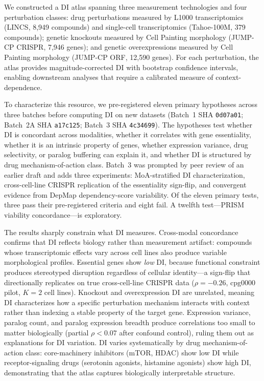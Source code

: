 \documentclass[11pt]{article}
\begin{document}
We constructed a DI atlas spanning three measurement technologies and
four perturbation classes: drug perturbations measured by L1000
transcriptomics (LINCS, 8{,}949 compounds) and single-cell
transcriptomics (Tahoe-100M, 379 compounds); genetic knockouts measured
by Cell Painting morphology (JUMP-CP CRISPR, 7{,}946 genes); and
genetic overexpressions measured by Cell Painting morphology (JUMP-CP
ORF, 12{,}590 genes).  For each perturbation, the atlas provides
magnitude-corrected DI with bootstrap confidence intervals, enabling
downstream analyses that require a calibrated measure of
context-dependence.

To characterize this resource, we pre-registered eleven primary
hypotheses across three batches before computing DI on new datasets
(Batch~1 SHA \texttt{0d07a01}; Batch~2A SHA \texttt{a17c125};
Batch~3 SHA \texttt{4c34699}).  The
hypotheses test whether DI is concordant across modalities,
whether it correlates with gene essentiality, whether it is an
intrinsic property of genes, whether expression variance,
drug selectivity, or paralog buffering can explain it, and whether
DI is structured by drug mechanism-of-action class.
Batch~3 was prompted by peer review of an earlier draft and adds three
experiments: MoA-stratified DI characterization, cross-cell-line CRISPR
replication of the essentiality sign-flip, and convergent evidence from
DepMap dependency-score variability.
Of the eleven primary tests, three pass their pre-registered criteria
and eight fail.  A twelfth test---PRISM viability concordance---is
exploratory.

The results sharply constrain what DI measures.  Cross-modal concordance confirms
that DI reflects biology rather than measurement artifact: compounds
whose transcriptomic effects vary across cell lines also produce
variable morphological profiles.  Essential genes show \emph{low} DI, because functional
constraint produces stereotyped disruption regardless of cellular
identity---a sign-flip that directionally replicates on true
cross-cell-line CRISPR data ($\rho = -0.26$, cpg0000 pilot, $K = 2$
cell lines).  Knockout and overexpression DI are unrelated, meaning DI
characterizes how a specific perturbation mechanism interacts with
context rather than indexing a stable property of the target gene.
Expression variance, paralog count, and paralog expression breadth
produce correlations too small to matter biologically (partial
$\rho < 0.07$ after confound control), ruling them out as explanations
for DI variation.  DI varies systematically by drug mechanism-of-action
class: core-machinery inhibitors (mTOR, HDAC) show low DI while
receptor-signaling drugs (serotonin agonists, histamine agonists)
show high DI, demonstrating that the atlas captures biologically
interpretable structure.
\end{document}
